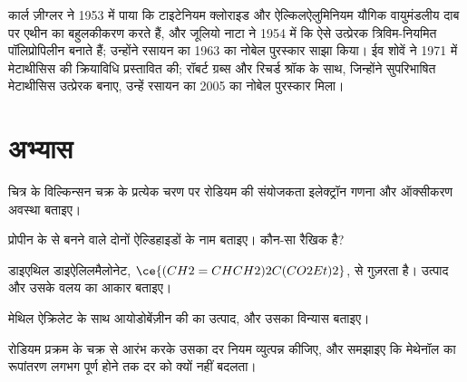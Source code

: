\begin{history}[ज़ीग्लर, नाटा, और मेटाथीसिस]
कार्ल ज़ीग्लर ने 1953 में पाया कि टाइटेनियम क्लोराइड और ऐल्किलऐलुमिनियम यौगिक
वायुमंडलीय दाब पर एथीन का बहुलकीकरण करते हैं, और जूलियो नाटा ने 1954 में कि ऐसे
उत्प्रेरक त्रिविम-नियमित पॉलिप्रोपिलीन बनाते हैं; उन्होंने रसायन का 1963 का नोबेल पुरस्कार
साझा किया। ईव शोवें ने 1971 में मेटाथीसिस की  क्रियाविधि
प्रस्तावित की; रॉबर्ट ग्रब्स और रिचर्ड श्रॉक के साथ, जिन्होंने सुपरिभाषित
मेटाथीसिस उत्प्रेरक बनाए, उन्हें रसायन का 2005 का नोबेल पुरस्कार मिला।
\end{history}

\section{अभ्यास}

\begin{exercise}[$\star$]\label{exo:b3:homogeneous-catalysis:1}
चित्र के विल्किन्सन चक्र के प्रत्येक चरण पर रोडियम की संयोजकता इलेक्ट्रॉन गणना और
ऑक्सीकरण अवस्था बताइए।
\end{exercise}

\begin{exercise}[$\star$]\label{exo:b3:homogeneous-catalysis:2}
प्रोपीन के  से बनने वाले दोनों ऐल्डिहाइडों के नाम बताइए। कौन-सा
रैखिक है?
\end{exercise}

\begin{exercise}[$\star$]\label{exo:b3:homogeneous-catalysis:3}
डाइएथिल डाइऐलिलमैलोनेट, $\ce{(CH2=CHCH2)2C(CO2Et)2}$,  से गुज़रता है।
उत्पाद और उसके वलय का आकार बताइए।
\end{exercise}

\begin{exercise}[$\star$]\label{exo:b3:homogeneous-catalysis:4}
मेथिल ऐक्रिलेट के साथ आयोडोबेंज़ीन की  का उत्पाद, और उसका
विन्यास बताइए।
\end{exercise}

\begin{exercise}[$\star\star$]\label{exo:b3:homogeneous-catalysis:5}
रोडियम प्रक्रम के चक्र से आरंभ करके उसका दर नियम व्युत्पन्न कीजिए, और समझाइए
कि मेथेनॉल का रूपांतरण लगभग पूर्ण होने तक दर को क्यों नहीं बदलता।
\end{exercise}

